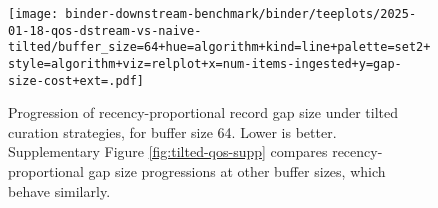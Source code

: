 \begin{figure}
\texttt{[image: binder-downstream-benchmark/binder/teeplots/2025-01-18-qos-dstream-vs-naive-tilted/buffer\_size=64+hue=algorithm+kind=line+palette=set2+style=algorithm+viz=relplot+x=num-items-ingested+y=gap-size-cost+ext=.pdf]}
\caption{%
Progression of recency-proportional record gap size under tilted curation strategies, for buffer size 64.
Lower is better.
Supplementary Figure \ref{fig:tilted-qos-supp} compares recency-proportional gap size progressions at other buffer sizes, which behave similarly.
}
\label{fig:tilted-qos}
\end{figure}
